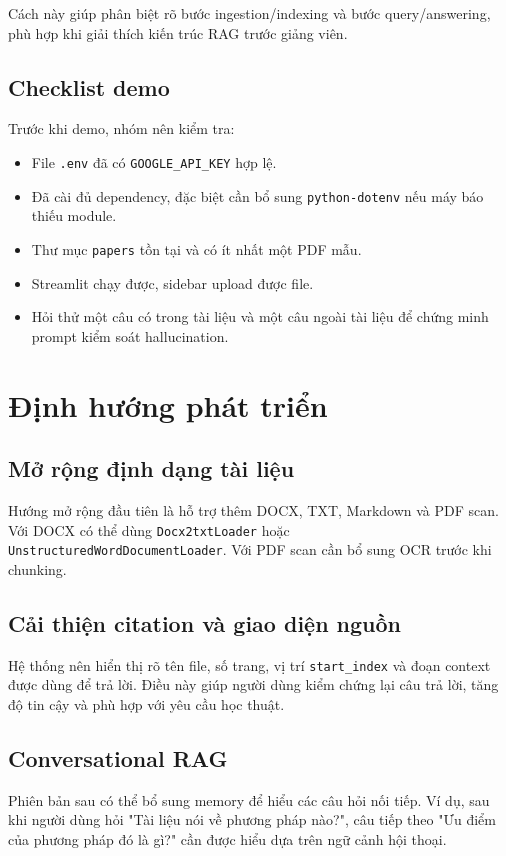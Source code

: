 \documentclass[10pt, conference, a4paper, compsocconf]{IEEEtran}
\begin{document}
Cách này giúp phân biệt rõ bước ingestion/indexing và bước query/answering, phù hợp khi giải thích kiến trúc RAG trước giảng viên.

\subsection{Checklist demo}
Trước khi demo, nhóm nên kiểm tra:
\begin{itemize}
    \item File \verb|.env| đã có \verb|GOOGLE_API_KEY| hợp lệ.
    \item Đã cài đủ dependency, đặc biệt cần bổ sung \verb|python-dotenv| nếu máy báo thiếu module.
    \item Thư mục \verb|papers| tồn tại và có ít nhất một PDF mẫu.
    \item Streamlit chạy được, sidebar upload được file.
    \item Hỏi thử một câu có trong tài liệu và một câu ngoài tài liệu để chứng minh prompt kiểm soát hallucination.
\end{itemize}

\section{Định hướng phát triển}
\subsection{Mở rộng định dạng tài liệu}
Hướng mở rộng đầu tiên là hỗ trợ thêm DOCX, TXT, Markdown và PDF scan. Với DOCX có thể dùng \verb|Docx2txtLoader| hoặc \verb|UnstructuredWordDocumentLoader|. Với PDF scan cần bổ sung OCR trước khi chunking.

\subsection{Cải thiện citation và giao diện nguồn}
Hệ thống nên hiển thị rõ tên file, số trang, vị trí \verb|start_index| và đoạn context được dùng để trả lời. Điều này giúp người dùng kiểm chứng lại câu trả lời, tăng độ tin cậy và phù hợp với yêu cầu học thuật.

\subsection{Conversational RAG}
Phiên bản sau có thể bổ sung memory để hiểu các câu hỏi nối tiếp. Ví dụ, sau khi người dùng hỏi "Tài liệu nói về phương pháp nào?", câu tiếp theo "Ưu điểm của phương pháp đó là gì?" cần được hiểu dựa trên ngữ cảnh hội thoại.
\end{document}
